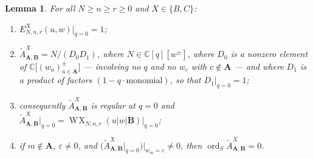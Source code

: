 \documentclass[11pt]{article}
\theoremstyle{plain}
\newtheorem{lem}[thm]{Lemma}
\theoremstyle{definition}
\newcommand{\At}{\widetilde{A}}
\newcommand{\bA}{\mathbf{A}}
\newcommand{\bB}{\mathbf{B}}
\newcommand{\ord}{\operatorname{ord}}
\DeclareMathOperator{\WX}{W\!X}
\begin{document}
\begin{lem}\label{lem:q0}
For all $N\ge n\ge r\ge0$ and $X\in\{B,C\}$:
\begin{enumerate}[label=(\arabic*),leftmargin=2.2em]
\item $E^{X}_{N,n,r}(u,w)\big|_{q=0}=1$;
\item $\At^{X}_{\bA,\bB}=N/(D_0D_1)$, where $N\in\mathbb{C}[q][w^{\pm}]$, where
  $D_0$ is a nonzero element of
  $\mathbb{C}\bigl[(w_a)^{\pm}_{a\in\bA}\bigr]$ --- involving \emph{no} $q$ and
  \emph{no} $w_c$ with $c\notin\bA$ --- and where $D_1$ is a product of factors
  $(1-q\cdot\text{monomial})$, so that $D_1|_{q=0}=1$;
\item consequently $\At^{X}_{\bA,\bB}$ is regular at $q=0$ and
  $\At^{X}_{\bA,\bB}\big|_{q=0}=\WX_{N,n,r}(u|w|\bB)\big|_{q=0}$;
\item if $m\notin\bA$, $\varepsilon\ne0$, and
  $\bigl(\At^{X}_{\bA,\bB}\big|_{q=0}\bigr)\big|_{w_m=\varepsilon}\ne0$, then
  $\ord_S\At^{X}_{\bA,\bB}=0$.
\end{enumerate}
\end{lem}
\end{document}
